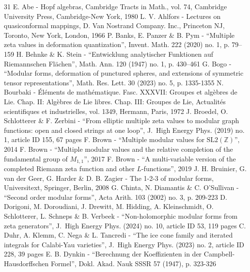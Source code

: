 \begin{thebibliography}{31}
E. Abe - Hopf algebras, Cambridge Tracts in Math., vol. 74, Cambridge University Press, Cambridge-New York, 1980
L. V. Ahlfors - Lectures on quasiconformal mappings, D. Van Nostrand Company. Inc., Princeton NJ, Toronto, New York, London, 1966
P. Banks, E. Panzer \& B. Pym - “Multiple zeta values in deformation quantization”, Invent. Math. 222 (2020) no. 1, p. 79–159
H. Behnke \& K. Stein - “Entwicklung analytischer Funktionen auf Riemannschen Flächen”, Math. Ann. 120 (1947) no. 1, p. 430–461
G. Bogo - “Modular forms, deformation of punctured spheres, and extensions of symmetric tensor representations”, Math. Res. Lett. 30 (2023) no. 5, p. 1335-1355
N. Bourbaki - Éléments de mathématique. Fasc. XXXVII: Groupes et algèbres de Lie. Chap. II: Algèbres de Lie libres. Chap. III: Groupes de Lie, Actualités scientifiques et industrielles, vol. 1349, Hermann, Paris, 1972
J. Broedel, O. Schlotterer \& F. Zerbini - “From elliptic multiple zeta values to modular graph functions: open and closed strings at one loop”, J. High Energy Phys. (2019) no. 1, article ID 155, 67 pages
F. Brown - “Multiple modular values for $\mathrm{SL}2(\mathbb{Z})$”, 2014
F. Brown - “Multiple modular values and the relative completion of the fundamental group of $M_{1,1}$”, 2017
F. Brown - “A multi-variable version of the completed Riemann zeta function and other $L$-functions”, 2019
J. H. Bruinier, G. van der Geer, G. Harder \& D. B. Zagier - The 1-2-3 of modular forms, Universitext, Springer, Berlin, 2008
G. Chinta, N. Diamantis \& C. O’Sullivan - “Second order modular forms”, Acta Arith. 103 (2002) no. 3, p. 209-223
D. Dorigoni, M. Doroudiani, J. Drewitt, M. Hidding, A. Kleinschmidt, O. Schlotterer, L. Schneps \& B. Verbeek - “Non-holomorphic modular forms from zeta generators”, J. High Energy Phys. (2024) no. 10, article ID 53, 119 pages
C. Duhr, A. Klemm, C. Nega \& L. Tancredi - “The ice cone family and iterated integrals for Calabi-Yau varieties”, J. High Energy Phys. (2023) no. 2, article ID 228, 39 pages
E. B. Dynkin - “Berechnung der Koeffizienten in der Campbell-Hausdorffschen Formel”, Dokl. Akad. Nauk SSSR 57 (1947), p. 323-326

\end{thebibliography}
